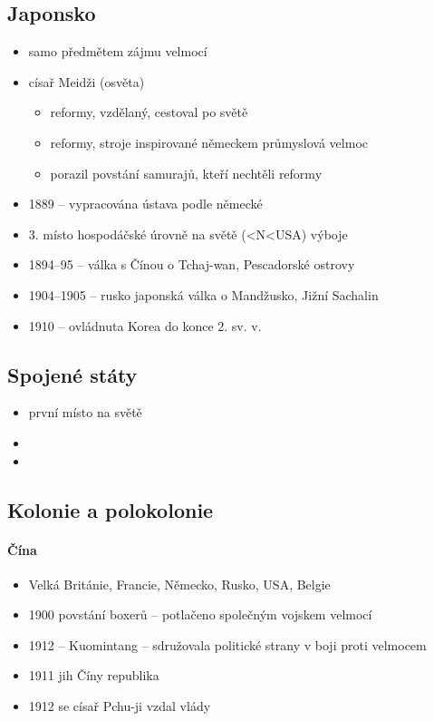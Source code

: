 \subsection{Japonsko}
\begin{itemize}
\item samo předmětem zájmu velmocí
\item císař Meidži (osvěta)
	\begin{itemize}
	\item reformy, vzdělaný, cestoval po světě
	\item reformy, stroje inspirované německem \ra průmyslová velmoc
	\item porazil povstání samurajů, kteří nechtěli reformy
	\end{itemize}
\item 1889 -- vypracována ústava podle německé
\item 3. místo hospodáčské úrovně na světě (<N<USA) \ra výboje 
\item 1894--95 -- válka s Čínou o Tchaj-wan, Pescadorské ostrovy
\item 1904--1905 -- rusko japonská válka o Mandžusko, Jižní Sachalin
\item 1910 -- ovládnuta Korea do konce 2. sv. v.
\end{itemize}

\subsection{Spojené státy}
\begin{itemize}
\item první místo na světě 
\item 
\item
\end{itemize}

\subsection{Kolonie a polokolonie}
\paragraph{Čína}
\begin{itemize}
\item Velká Británie, Francie, Německo, Rusko, USA, Belgie
\item 1900 povstání boxerů -- potlačeno společným vojskem velmocí
\item 1912 -- Kuomintang -- sdružovala politické strany v boji proti velmocem
\item 1911 jih Číny \ra republika
\item 1912 se císař Pchu-ji vzdal vlády
\end{itemize}

